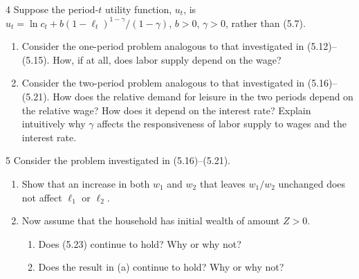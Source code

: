 \begin{problem}{4}
Suppose the period-\(t\) utility function, \(u_t\), is \(u_t=\ln c_t+b\left(1-\ell_t\right)^{1-\gamma}/\left(1-\gamma\right)\), \(b>0\), \(\gamma>0\), rather than (5.7).
\begin{enumerate}[label=(\alph*)]
    \item Consider the one-period problem analogous to that investigated in (5.12)--(5.15). How, if at all, does labor supply depend on the wage?
    \item Consider the two-period problem analogous to that investigated in (5.16)--(5.21). How does the relative demand for leisure in the two periods depend on the relative wage? How does it depend on the interest rate? Explain intuitively why \(\gamma\) affects the responsiveness of labor supply to wages and the interest rate.
\end{enumerate}
\end{problem}

\begin{problem}{5}
Consider the problem investigated in (5.16)--(5.21).
\begin{enumerate}[label=(\alph*)]
    \item Show that an increase in both \(w_1\) and \(w_2\) that leaves \(w_1/w_2\) unchanged does not affect \(\ell_1\) or \(\ell_2\).
    \item Now assume that the household has initial wealth of amount \(Z>0\).
    \begin{enumerate}[label=(\roman*)]
        \item Does (5.23) continue to hold? Why or why not?
        \item Does the result in (a) continue to hold? Why or why not?
    \end{enumerate}
\end{enumerate}
\end{problem}

